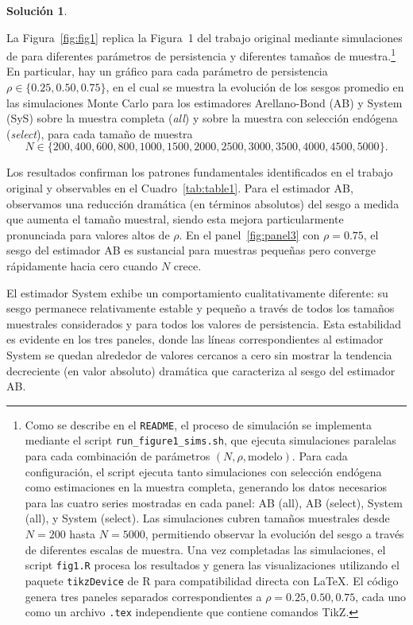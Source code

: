 \documentclass[12pt,letterpaper,reqno,oneside]{amsart}
\theoremstyle{problemstyle} %
\theoremstyle{definition} %
\newtheorem{solution}{Solución}[problem]
\begin{document}
\begin{solution} %
  \label{sol:2}

  La Figura~\ref{fig:fig1} replica la Figura~1 del trabajo original mediante simulaciones de para diferentes parámetros de persistencia y diferentes tamaños de muestra.\footnote{Como se describe en el \texttt{README}, el proceso de simulación se implementa mediante el script \texttt{run\_figure1\_sims.sh}, que ejecuta simulaciones paralelas para cada combinación de parámetros $(N, \rho, \text{modelo})$.
    Para cada configuración, el script ejecuta tanto simulaciones con selección endógena como estimaciones en la muestra completa, generando los datos necesarios para las cuatro series mostradas en cada panel: AB (all), AB (select), System (all), y System (select).
    Las simulaciones cubren tamaños muestrales desde $N = 200$ hasta $N = 5000$, permitiendo observar la evolución del sesgo a través de diferentes escalas de muestra.
    Una vez completadas las simulaciones, el script \texttt{fig1.R} procesa los resultados y genera las visualizaciones utilizando el paquete \texttt{tikzDevice} de R para compatibilidad directa con \LaTeX.
    El código genera tres paneles separados correspondientes a $\rho = 0.25, 0.50, 0.75$, cada uno como un archivo \texttt{.tex} independiente que contiene comandos TikZ.}
  En particular, hay un gráfico para cada parámetro de persistencia $\rho \in \{0.25, 0.50, 0.75\}$, en el cual se muestra la evolución de los sesgos promedio en las simulaciones Monte Carlo para los estimadores Arellano-Bond (AB) y System (SyS) sobre la muestra completa (\emph{all}) y sobre la muestra con selección endógena (\emph{select}), para cada tamaño de muestra
  \begin{equation*}
    N \in \{200, 400, 600, 800, 1000, 1500, 2000, 2500, 3000, 3500, 4000, 4500, 5000\}.
  \end{equation*}

  Los resultados confirman los patrones fundamentales identificados en el trabajo original y observables en el Cuadro~\ref{tab:table1}.
  Para el estimador AB, observamos una reducción dramática (en términos absolutos) del sesgo a medida que aumenta el tamaño muestral, siendo esta mejora particularmente pronunciada para valores altos de $\rho$.
  En el panel~\ref{fig:panel3} con $\rho = 0.75$, el sesgo del estimador AB es sustancial para muestras pequeñas pero converge rápidamente hacia cero cuando $N$ crece.

  El estimador System exhibe un comportamiento cualitativamente diferente: su sesgo permanece relativamente estable y pequeño a través de todos los tamaños muestrales considerados y para todos los valores de persistencia.
  Esta estabilidad es evidente en los tres paneles, donde las líneas correspondientes al estimador System se quedan alrededor de valores cercanos a cero sin mostrar la tendencia decreciente (en valor absoluto) dramática que caracteriza al sesgo del estimador AB.



\end{solution}
\end{document}
